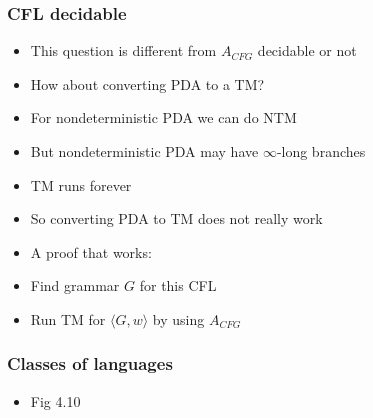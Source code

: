 \begin{frame}[allowframebreaks] \frametitle{CFL decidable}
  \begin{itemize}
\item This question is different from $A_{CFG}$ decidable
or not
\item How about converting PDA to a TM?
\item For nondeterministic PDA we can do NTM 
\item But nondeterministic PDA may have $\infty$-long branches

\item [] TM runs forever
\item So converting PDA to TM does not really work
\item A proof that works:

\item [] Find grammar $G$ for this CFL
\item [] Run TM for $\langle  G,w\rangle $ by using 
$A_{CFG}$
\end{itemize}\end{frame}

\begin{frame}[allowframebreaks] \frametitle{Classes of languages}
  \begin{itemize}
  \item Fig 4.10

\begin{center}
    \end{center}
  \end{itemize}\end{frame}



